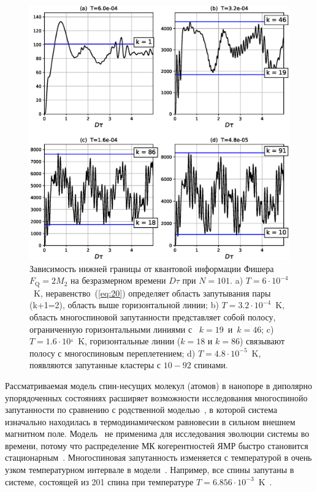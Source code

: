 \documentclass[utf8]{jetp}
\begin{document}
\begin{figure}
  	\includegraphics[width=0.95\linewidth]{fisher_low_bound_n101.eps}
	\caption{
	    Зависимость нижней границы от квантовой информации Фишера $F_\mathrm{Q} = 2 M_{2}$ 
	    на безразмерном времени $D\tau$ при $N=101$.
	    a) $T=6\cdot10^{-4}$~K, неравенство~(\ref{eq:20}) определяет область запутывания пары (k+1=2), область выше горизонтальной линии; 
	    b) $T=3.2\cdot10^{-4}$~K, область многоспиновой запутанности представляет собой полосу, ограниченную горизонтальными линиями с ~$k=19$~и~$k=46$; 
	    c) $T = 1.6\cdot10^{_4}$~K, горизонтальные линии ($k=18$ и $k=86$) связывают полосу с многоспиновым переплетением;
	    d) $T=4.8\cdot10^{-5}$~K, появляются запутанные кластеры с $10-92$ спинами.
	}
	\label{fig:2}
\end{figure}

Рассматриваемая модель спин-несущих молекул (атомов) в нанопоре в диполярно упорядоченных состояниях расширяет возможности исследования многоспинойо запутанности по сравнению с родственной моделью~\cite{Doronin_2019},
в которой система изначально находилась в термодинамическом равновесии в сильном внешнем магнитном поле.
Модель~\cite{Doronin_2019} не применима для исследования эволюции системы во времени,
потому что распределение МК когерентностей ЯМР быстро становится стационарным~\cite{Doronin_2009}.
Многоспиновая запутанность изменяется с температурой в очень узком температурном интервале в модели~\cite{Doronin_2019}.
Например, все спины запутаны в системе, состоящей из 201 спина при температуре $T=6.856\cdot10^{-3}$~K~\cite{Doronin_2019}.
\end{document}
